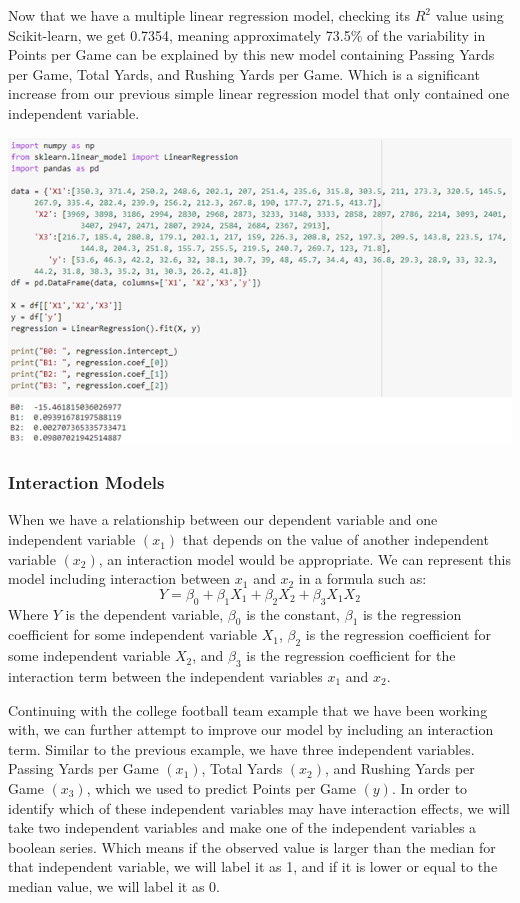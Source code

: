 \documentclass[a4paper,12pt]{report}
\begin{document}
Now that we have a multiple linear regression model, checking its $R^2$ value using Scikit-learn, we get 0.7354, meaning approximately 73.5\% of the variability in Points per Game can be explained by this new model containing Passing Yards per Game, Total Yards, and Rushing Yards per Game. Which is a significant increase from our previous simple linear regression model that only contained one independent variable. 

\begin{center}
    \captionsetup{type=figure}
    \includegraphics[width=.9\linewidth]{media/fullRegressionPic.png}
\end{center}

\subsubsection{Interaction Models}
When we have a relationship between our dependent variable  and one independent variable $(x_1)$ that depends on the value of another independent variable $(x_2)$, an interaction model would be appropriate. We can represent this model including interaction between $x_1$ and $x_2$ in a formula such as:
$$Y=\beta_0+\beta_1X_1+\beta_2X_2+\beta_3X_1X_2$$
Where $Y$ is the dependent variable, $\beta_0$ is the constant, $\beta_1$ is the regression coefficient for some independent variable $X_1$, $\beta_2$ is the regression coefficient for some independent variable $X_2$, and $\beta_3$ is the regression coefficient for the interaction term between the independent variables $x_1$ and $x_2$.

Continuing with the college football team example that we have been working with, we can further attempt to improve our model by including an interaction term. Similar to the previous example, we have three independent variables. Passing Yards per Game $(x_1)$, Total Yards $(x_2)$, and Rushing Yards per Game $(x_3)$, which we used to predict Points per Game $(y)$. In order to identify which of these independent variables may have interaction effects, we will take two independent variables and make one of the independent variables a boolean series. Which means if the observed value is larger than the median for that independent variable, we will label it as 1, and if it is lower or equal to the median value, we will label it as 0.
\end{document}
